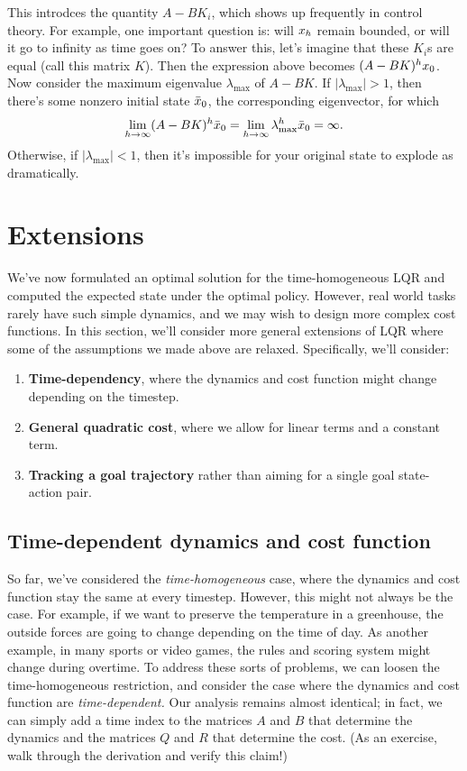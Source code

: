 \documentclass[../main/main]{subfiles}
\begin{document}
This introdces the quantity $A - B K_i$, which shows up frequently in control theory.
For example, one important question is: will $x_h$ remain bounded,
or will it go to infinity as time goes on?
To answer this, let's imagine that these $K_i$s are equal (call this matrix $K$).
Then the expression above becomes $(A-BK)^h x_0$.
Now consider the maximum eigenvalue $\lambda_{\max}$ of $A - BK$.
If $|\lambda_{\max}| > 1$, then there's some nonzero initial state $\bar {x}_0$, the corresponding eigenvector, for which \[
    \lim_{h \to \infty} (A - BK)^h \bar {x}_0
    = \lim_{h \to \infty} \lambda_{\max}^h \bar {x}_0
    = \infty.
\]
Otherwise, if $|\lambda_{\max}| < 1$, then it's impossible for your original state to explode as dramatically.

\section{Extensions}

We've now formulated an optimal solution for the time-homogeneous LQR
and computed the expected state under the optimal policy.
However, real world tasks rarely have such simple dynamics, and we may wish to design more complex cost functions.
In this section, we'll consider more general extensions of LQR where some of the assumptions we made above are relaxed.
Specifically, we'll consider:
\begin{enumerate}
    \item \textbf{Time-dependency}, where the dynamics and cost function might change depending on the timestep.
    \item \textbf{General quadratic cost}, where we allow for linear terms and a constant term.
    \item \textbf{Tracking a goal trajectory} rather than aiming for a single goal state-action pair.
\end{enumerate}

\subsection[Time-dependency]{Time-dependent dynamics and cost function} \label{sec:time_dep_lqr}

So far, we've considered the \emph{time-homogeneous} case,
where the dynamics and cost function stay the same at every timestep.
However, this might not always be the case.
For example, if we want to preserve the temperature in a greenhouse, the outside forces are going to change depending on the time of day.
As another example, in many sports or video games, the rules and scoring system might change during overtime.
To address these sorts of problems, we can loosen the time-homogeneous restriction, and consider the case where the dynamics and cost function are \emph{time-dependent.}
Our analysis remains almost identical; in fact, we can simply add a time index to the matrices $A$ and $B$ that determine the dynamics and the matrices $Q$ and $R$ that determine the cost. (As an exercise, walk through the derivation and verify this claim!)
\end{document}
